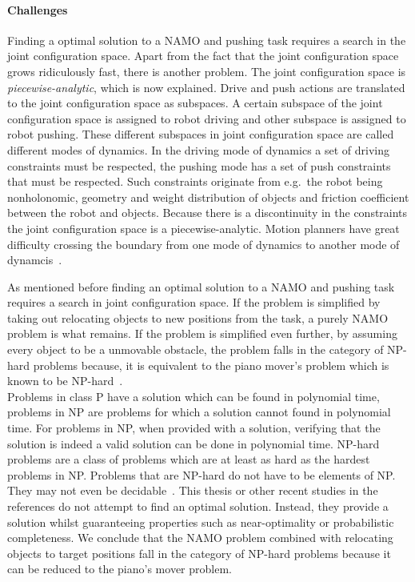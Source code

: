 \paragraph{Challenges}
Finding a optimal solution to a \ac{NAMO} and pushing task requires a search in the joint configuration space. Apart from the fact that the joint configuration space grows ridiculously fast, there is another problem. The joint configuration space is \textit{piecewise-analytic}, which is now explained. Drive and push actions are translated to the joint configuration space as subspaces. A certain subspace of the joint configuration space is assigned to robot driving and other subspace is assigned to robot pushing. These different subspaces in joint configuration space are called different modes of dynamics. In the driving mode of dynamics a set of driving constraints must be respected, the pushing mode has a set of push constraints that must be respected. Such constraints originate from e.g.~the robot being nonholonomic, geometry and weight distribution of objects and friction coefficient between the robot and objects. Because there is a discontinuity in the constraints the joint configuration space is a piecewise-analytic. Motion planners have great difficulty crossing the boundary from one mode of dynamics to another mode of dynamcis~\cite{vega-brown_asymptotically_2020}.\bs

As mentioned before finding an optimal solution to a \ac{NAMO} and pushing task requires a search in joint configuration space. If the problem is simplified by taking out relocating objects to new positions from the task, a purely \ac{NAMO} problem is what remains. If the problem is simplified even further, by assuming every object to be a unmovable obstacle, the problem falls in the category of \ac{NP-hard} problems because, it is equivalent to the piano mover's problem which is known to be \ac{NP-hard}~\cite{reif_motion_1985}.\\
Problems in class P have a solution which can be found in polynomial time, problems in \ac{NP} are problems for which a solution cannot found in polynomial time. For problems in \ac{NP}, when provided with a solution, verifying that the solution is indeed a valid solution can be done in polynomial time. \ac{NP-hard} problems are a class of problems which are at least as hard as the hardest problems in \ac{NP}. Problems that are \ac{NP-hard} do not have to be elements of NP. They may not even be decidable~\cite{pokharel_computational_2020}. This thesis or other recent studies in the references do not attempt to find an optimal solution. Instead, they provide a solution whilst guaranteeing properties such as near-optimality or probabilistic completeness. We conclude that the \ac{NAMO} problem combined with relocating objects to target positions fall in the category of \ac{NP-hard} problems because it can be reduced to the piano's mover problem.\bs

